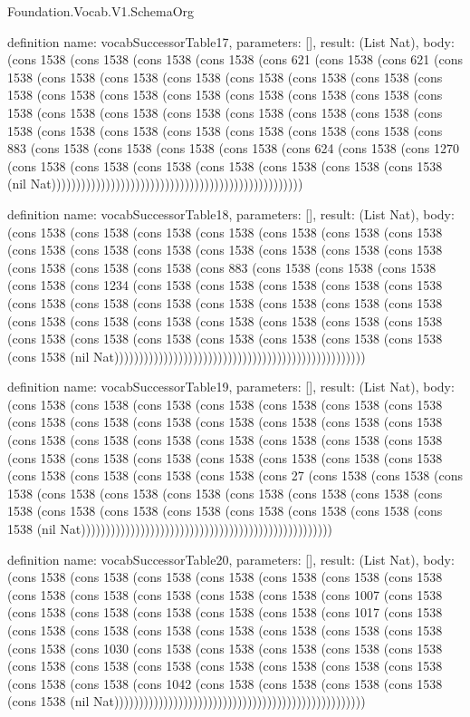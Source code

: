 \begin{lexlean}{Foundation.Vocab.V1.SchemaOrg}
\begin{semanticmodule}
definition{
  name: vocabSuccessorTable17,
  parameters: [],
  result: (List Nat),
  body: (cons 1538 (cons 1538 (cons 1538 (cons 1538 (cons 621 (cons 1538 (cons 621 (cons 1538 (cons 1538 (cons 1538 (cons 1538 (cons 1538 (cons 1538 (cons 1538 (cons 1538 (cons 1538 (cons 1538 (cons 1538 (cons 1538 (cons 1538 (cons 1538 (cons 1538 (cons 1538 (cons 1538 (cons 1538 (cons 1538 (cons 1538 (cons 1538 (cons 1538 (cons 1538 (cons 1538 (cons 1538 (cons 1538 (cons 1538 (cons 1538 (cons 883 (cons 1538 (cons 1538 (cons 1538 (cons 1538 (cons 624 (cons 1538 (cons 1270 (cons 1538 (cons 1538 (cons 1538 (cons 1538 (cons 1538 (cons 1538 (cons 1538 (nil Nat)))))))))))))))))))))))))))))))))))))))))))))))))))
}

definition{
  name: vocabSuccessorTable18,
  parameters: [],
  result: (List Nat),
  body: (cons 1538 (cons 1538 (cons 1538 (cons 1538 (cons 1538 (cons 1538 (cons 1538 (cons 1538 (cons 1538 (cons 1538 (cons 1538 (cons 1538 (cons 1538 (cons 1538 (cons 1538 (cons 1538 (cons 1538 (cons 883 (cons 1538 (cons 1538 (cons 1538 (cons 1538 (cons 1234 (cons 1538 (cons 1538 (cons 1538 (cons 1538 (cons 1538 (cons 1538 (cons 1538 (cons 1538 (cons 1538 (cons 1538 (cons 1538 (cons 1538 (cons 1538 (cons 1538 (cons 1538 (cons 1538 (cons 1538 (cons 1538 (cons 1538 (cons 1538 (cons 1538 (cons 1538 (cons 1538 (cons 1538 (cons 1538 (cons 1538 (cons 1538 (nil Nat)))))))))))))))))))))))))))))))))))))))))))))))))))
}

definition{
  name: vocabSuccessorTable19,
  parameters: [],
  result: (List Nat),
  body: (cons 1538 (cons 1538 (cons 1538 (cons 1538 (cons 1538 (cons 1538 (cons 1538 (cons 1538 (cons 1538 (cons 1538 (cons 1538 (cons 1538 (cons 1538 (cons 1538 (cons 1538 (cons 1538 (cons 1538 (cons 1538 (cons 1538 (cons 1538 (cons 1538 (cons 1538 (cons 1538 (cons 1538 (cons 1538 (cons 1538 (cons 1538 (cons 1538 (cons 1538 (cons 1538 (cons 1538 (cons 1538 (cons 27 (cons 1538 (cons 1538 (cons 1538 (cons 1538 (cons 1538 (cons 1538 (cons 1538 (cons 1538 (cons 1538 (cons 1538 (cons 1538 (cons 1538 (cons 1538 (cons 1538 (cons 1538 (cons 1538 (cons 1538 (nil Nat)))))))))))))))))))))))))))))))))))))))))))))))))))
}

definition{
  name: vocabSuccessorTable20,
  parameters: [],
  result: (List Nat),
  body: (cons 1538 (cons 1538 (cons 1538 (cons 1538 (cons 1538 (cons 1538 (cons 1538 (cons 1538 (cons 1538 (cons 1538 (cons 1538 (cons 1538 (cons 1007 (cons 1538 (cons 1538 (cons 1538 (cons 1538 (cons 1538 (cons 1538 (cons 1017 (cons 1538 (cons 1538 (cons 1538 (cons 1538 (cons 1538 (cons 1538 (cons 1538 (cons 1538 (cons 1538 (cons 1030 (cons 1538 (cons 1538 (cons 1538 (cons 1538 (cons 1538 (cons 1538 (cons 1538 (cons 1538 (cons 1538 (cons 1538 (cons 1538 (cons 1538 (cons 1538 (cons 1538 (cons 1042 (cons 1538 (cons 1538 (cons 1538 (cons 1538 (cons 1538 (nil Nat)))))))))))))))))))))))))))))))))))))))))))))))))))
}


\end{semanticmodule}
\end{lexlean}

